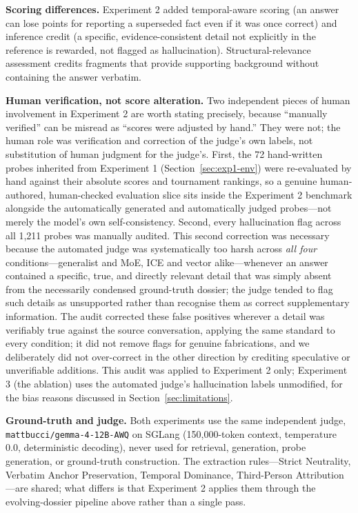 \documentclass[11pt,a4paper]{article}
\begin{document}
\textbf{Scoring differences.} Experiment 2 added temporal-aware scoring (an answer can lose points for reporting a superseded fact even if it was once correct) and inference credit (a specific, evidence-consistent detail not explicitly in the reference is rewarded, not flagged as hallucination). Structural-relevance assessment credits fragments that provide supporting background without containing the answer verbatim.

\textbf{Human verification, not score alteration.} Two independent pieces of human involvement in Experiment 2 are worth stating precisely, because ``manually verified'' can be misread as ``scores were adjusted by hand.'' They were not; the human role was verification and correction of the judge's own labels, not substitution of human judgment for the judge's. First, the 72 hand-written probes inherited from Experiment 1 (Section~\ref{sec:exp1-env}) were re-evaluated by hand against their absolute scores and tournament rankings, so a genuine human-authored, human-checked evaluation slice sits inside the Experiment 2 benchmark alongside the automatically generated and automatically judged probes---not merely the model's own self-consistency. Second, every hallucination flag across all 1{,}211 probes was manually audited. This second correction was necessary because the automated judge was systematically too harsh across \emph{all four} conditions---generalist and MoE, ICE and vector alike---whenever an answer contained a specific, true, and directly relevant detail that was simply absent from the necessarily condensed ground-truth dossier; the judge tended to flag such details as unsupported rather than recognise them as correct supplementary information. The audit corrected these false positives wherever a detail was verifiably true against the source conversation, applying the same standard to every condition; it did not remove flags for genuine fabrications, and we deliberately did not over-correct in the other direction by crediting speculative or unverifiable additions. This audit was applied to Experiment 2 only; Experiment 3 (the ablation) uses the automated judge's hallucination labels unmodified, for the bias reasons discussed in Section~\ref{sec:limitations}.

\textbf{Ground-truth and judge.} Both experiments use the same independent judge, \texttt{mattbucci/gemma-4-12B-AWQ} on SGLang (150{,}000-token context, temperature 0.0, deterministic decoding), never used for retrieval, generation, probe generation, or ground-truth construction. The extraction rules---Strict Neutrality, Verbatim Anchor Preservation, Temporal Dominance, Third-Person Attribution---are shared; what differs is that Experiment 2 applies them through the evolving-dossier pipeline above rather than a single pass.
\end{document}

